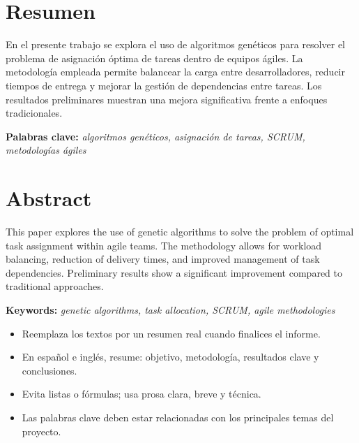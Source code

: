 \newpage
\section*{Resumen}

En el presente trabajo se explora el uso de algoritmos genéticos para resolver el problema de asignación óptima de tareas dentro de equipos ágiles. La metodología empleada permite balancear la carga entre desarrolladores, reducir tiempos de entrega y mejorar la gestión de dependencias entre tareas. Los resultados preliminares muestran una mejora significativa frente a enfoques tradicionales.

\vspace{0.5cm}

\textbf{Palabras clave:} \textit{algoritmos genéticos, asignación de tareas, SCRUM, metodologías ágiles}

\vspace{1cm}

\section*{Abstract}

This paper explores the use of genetic algorithms to solve the problem of optimal task assignment within agile teams. The methodology allows for workload balancing, reduction of delivery times, and improved management of task dependencies. Preliminary results show a significant improvement compared to traditional approaches.

\vspace{0.5cm}

\textbf{Keywords:} \textit{genetic algorithms, task allocation, SCRUM, agile methodologies}

\vspace{1cm}

\begin{tcolorbox}[colback=gray!10, colframe=black!30, title={Sugerencias para esta sección}]
    \begin{itemize}
        \item Reemplaza los textos por un resumen real cuando finalices el informe.
        \item En español e inglés, resume: objetivo, metodología, resultados clave y conclusiones.
        \item Evita listas o fórmulas; usa prosa clara, breve y técnica.
        \item Las palabras clave deben estar relacionadas con los principales temas del proyecto.
    \end{itemize}
\end{tcolorbox}

\newpage
